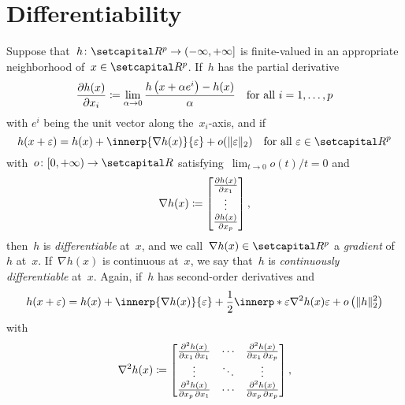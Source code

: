 \documentclass[../main]{subfiles}
\begin{document}
\section{Differentiability}
Suppose that~$h \colon \setR^p \to (-\infty, +\infty]$ is finite-valued in an appropriate neighborhood of~$x \in \setR^p$.
    If~$h$ has the partial derivative
    \begin{equation} \label{eq:pdv}
            \pdv{h(x)}{x_i} \coloneqq \lim_{\alpha \to 0} \frac{h\left(x + \alpha e^i\right) - h(x)}{\alpha} \quad \text{for all~$i = 1, \dots, p$}
        \end{equation}
    with $e^i$ being the unit vector along the~$x_i$-axis, and if
    \begin{equation} \label{eq:first_order_approximation}
            h(x + \varepsilon) = h(x) + \innerp{\nabla h(x)}{\varepsilon} + o(\norm{\varepsilon}_2) \forallcondition{\varepsilon \in \setR^p}
        \end{equation}
    with~$o \colon [0, +\infty) \to \setR$ satisfying~$\lim_{t \to 0} o(t) / t = 0$ and
\begin{equation} \label{eq:grad}
    \nabla h(x) \coloneqq
    \begin{bmatrix}
        \pdv{h(x)}{x_1} \\ \vdots \\ \pdv{h(x)}{x_p}
    \end{bmatrix}
    ,\end{equation}
then~$h$ is \emph{differentiable} at~$x$, and we call~$\nabla h(x) \in \setR^p$ a \emph{gradient} of~$h$ at~$x$.
If~$\nabla h(x)$ is continuous at~$x$, we say that~$h$ is \emph{continuously differentiable} at~$x$.
Again, if~$h$ has second-order derivatives and
\begin{equation}
    h(x + \varepsilon) = h(x) + \innerp{\nabla h(x)}{\varepsilon} + \frac{1}{2} \innerp*{\varepsilon}{\nabla^2 h(x) \varepsilon} + o\left(\norm{h}_2^2\right)
\end{equation}
with
\begin{equation} \label{eq:hess}
    \nabla^2 h(x) \coloneqq
    \begin{bmatrix}
        \pdv{h(x)}{x_1,x_1} & \cdots & \pdv{h(x)}{x_1,x_p} \\
        \vdots              & \ddots & \vdots              \\
        \pdv{h(x)}{x_p,x_1} & \cdots & \pdv{h(x)}{x_p,x_p} \\
    \end{bmatrix}
    ,\end{equation}
\end{document}
